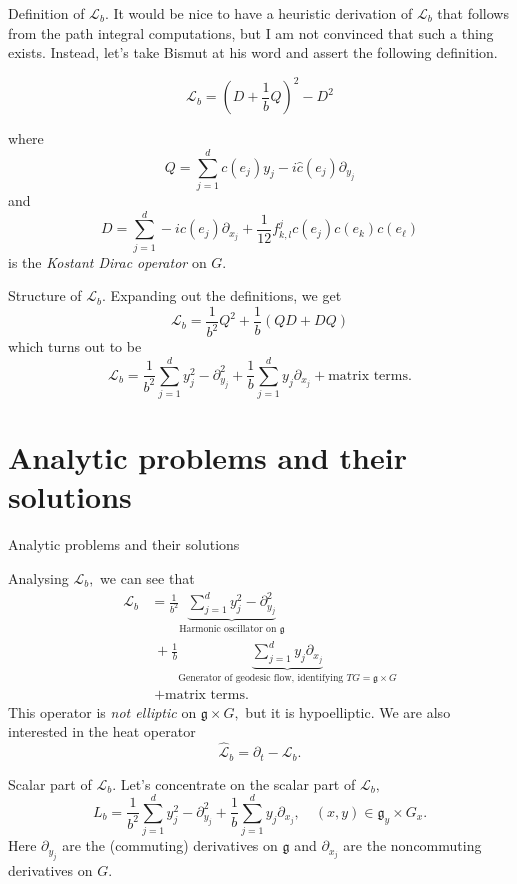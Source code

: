 \documentclass{beamer}
\numberwithin{equation}{section}
\theoremstyle{plain}
\theoremstyle{plain}
\theoremstyle{definition}
\theoremstyle{plain}
\theoremstyle{plain}
\theoremstyle{definition}
\newcommand{\Lc}{\mathcal{L}}
\newcommand{\gf}{\mathfrak{g}}
\begin{document}
\begin{frame}{Definition of $\Lc_b.$}
  It would be nice to have a heuristic derivation of $\Lc_b$ that follows from the path integral computations, but I am not convinced that such a thing exists. Instead, let's take Bismut at his word and assert the following definition.
  \begin{definition}
    \[
      \Lc_b = (D+\frac1bQ)^2-D^2
    \]
  \end{definition}
  where
  \[
    Q = \sum_{j=1}^d c(e_j)y_j-i\widehat{c}(e_j)\partial_{y_j}
  \]
  and 
  \[
    D = \sum_{j=1}^d -ic(e_j)\partial_{x_j}+\frac{1}{12}f^j_{k,l}c(e_j)c(e_k)c(e_\ell)
  \]
  is the \emph{Kostant Dirac operator} on $G.$
\end{frame}

\begin{frame}{Structure of $\Lc_b.$}
  Expanding out the definitions, we get
  \[
    \Lc_b = \frac{1}{b^2}Q^2+\frac{1}{b}(QD+DQ)
  \]
  which turns out to be
  \[
    \Lc_b = \frac{1}{b^2}\sum_{j=1}^d y_j^2-\partial_{y_j}^2 + \frac{1}{b}\sum_{j=1}^dy_j\partial_{x_j} + \text{matrix terms.}
  \]
\end{frame}

\section{Analytic problems and their solutions}

\begin{frame}
  \huge{Analytic problems and their solutions}
\end{frame}

\begin{frame}
  Analysing $\Lc_b,$ we can see that 
  \begin{align*}
    \Lc_b &= \frac{1}{b^2}\underbrace{\sum_{j=1}^d y_j^2-\partial_{y_j}^2}_{\text{Harmonic oscillator on } \gf}\\
          &\;+ \frac{1}{b}\underbrace{\sum_{j=1}^d y_j\partial_{x_j}}_{\text{Generator of geodesic flow, identifying }TG=\gf\times G}\\
          &\;+ \text{matrix terms.}
  \end{align*}
  This operator is \emph{not elliptic} on $\gf\times G,$ but it is hypoelliptic. We are also interested in the heat operator
  \[
      \widehat{\Lc}_b = \partial_t-\Lc_b.
  \]
\end{frame}

\begin{frame}{Scalar part of $\Lc_b.$}
  Let's concentrate on the scalar part of $\Lc_b,$
  \[
    L_b =\frac{1}{b^2}\sum_{j=1}^d y_j^2-\partial_{y_j}^2 + \frac{1}{b}\sum_{j=1}^dy_j\partial_{x_j},\quad (x,y) \in \gf_y\times G_x.
  \]
  Here $\partial_{y_j}$ are the (commuting) derivatives on $\gf$ and $\partial_{x_j}$ are the noncommuting derivatives on $G.$
\end{frame}
\end{document}
